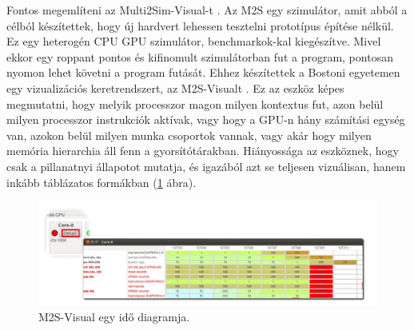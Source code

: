 Fontos megemlíteni az Multi2Sim-Visual-t \cite{m2s}. Az M2S egy szimulátor, amit abból a célból készítettek, hogy új hardvert lehessen tesztelni prototípus építése nélkül. Ez egy heterogén CPU GPU szimulátor, benchmarkok-kal kiegészítve. Mivel ekkor egy roppant pontos és kifinomult szimulátorban fut a program, pontosan nyomon lehet követni a program futását. Ehhez készítettek a Bostoni egyetemen egy vizualizációs keretrendszert, az M2S-Visualt \cite{m2sv}. Ez az eszköz képes megmutatni, hogy melyik processzor magon milyen kontextus fut, azon belül milyen processzor instrukciók aktívak, vagy hogy a GPU-n hány számítási egység van, azokon belül milyen munka csoportok vannak, vagy akár hogy milyen memória hierarchia áll fenn a gyorsítótárakban.
Hiányossága az eszköznek, hogy csak a pillanatnyi állapotot mutatja, és igazából azt se teljesen vizuálisan, hanem inkább táblázatos formákban (\ref{fig:m2svf} ábra).

\begin{figure}[h]
\centering
\includegraphics[scale=0.5]{images/m2sv2.jpg}
\caption{M2S-Visual egy idő diagramja. \cite{m2sv}}
\label{fig:m2svf}
\end{figure}

